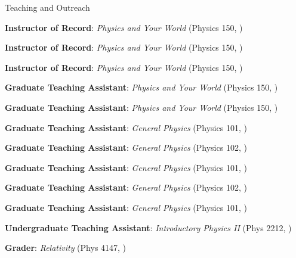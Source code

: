 \begingroup  %

\newcommand{\job}[3]{\entry*[#1]\textbf{#2}: #3}

\newcommand{\class}[5]{\job{#1}{#2}{\textit{#3} (#4, #5)}}


\begin{rubric}{Teaching and Outreach}

    \class{Spring 2024}
        {Instructor of Record}
        {Physics and Your World}
        {Physics 150}
        {}

    \class{Fall 2023}
        {Instructor of Record}
        {Physics and Your World}
        {Physics 150}
        {}

    \class{Spring 2023}
        {Instructor of Record}
        {Physics and Your World}
        {Physics 150}
        {}

    \class{Fall 2022}
        {Graduate Teaching Assistant}
        {Physics and Your World}
        {Physics 150}
        {}

    \class{Spring 2022}
        {Graduate Teaching Assistant}
        {Physics and Your World}
        {Physics 150}
        {}

    \class{Summer 2021}
        {Graduate Teaching Assistant}
        {General Physics}
        {Physics 101}
        {}

    \class{Spring 2021}
        {Graduate Teaching Assistant}
        {General Physics}
        {Physics 102}
        {}

    \class{Fall 2020}
        {Graduate Teaching Assistant}
        {General Physics}
        {Physics 101}
        {}

    \class{Spring 2020}
        {Graduate Teaching Assistant}
        {General Physics}
        {Physics 102}
        {}

    \class{Fall 2019}
        {Graduate Teaching Assistant}
        {General Physics}
        {Physics 101}
        {\smc{WSU}}

    \class{2018--2019}
        {Undergraduate Teaching Assistant}
        {Introductory Physics II}
        {Phys 2212}
        {}

    \class{Fall 2018}
        {Grader}
        {Relativity}
        {Phys 4147}
        {\smc{GT}}



\end{rubric}
